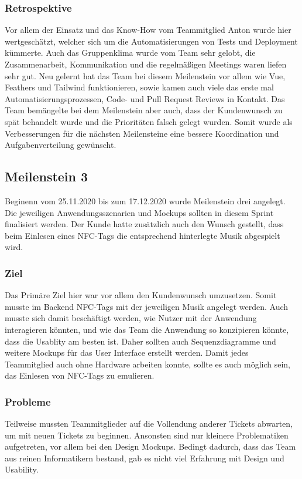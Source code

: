 \documentclass[10pt, a4paper, draft]{article}
\begin{document}
\subsubsection{Retrospektive}
Vor allem der Einsatz und das Know-How vom Teammitglied Anton wurde hier wertgeschätzt, welcher sich um die Automatisierungen von Tests und Deployment kümmerte.
Auch das Gruppenklima wurde vom Team sehr gelobt, die Zusammenarbeit, Kommunikation und die regelmäßigen Meetings waren liefen sehr gut.
Neu gelernt hat das Team bei diesem Meilenstein vor allem wie Vue, Feathers und Tailwind funktionieren, sowie kamen auch viele das erste mal Automatisierungsprozessen, Code- und Pull Request Reviews in Kontakt.
Das Team bemängelte bei dem Meilenstein aber auch, dass der Kundenwunsch zu spät behandelt wurde und die Prioritäten falsch gelegt wurden.
Somit wurde als Verbesserungen für die nächsten Meilensteine eine bessere Koordination und Aufgabenverteilung gewünscht.

\subsection{Meilenstein 3}
Beginenn vom 25.11.2020 bis zum 17.12.2020 wurde Meilenstein drei angelegt.
Die jeweiligen Anwendungsszenarien und Mockups sollten in diesem Sprint finalisiert werden.
Der Kunde hatte zusätzlich auch den Wunsch gestellt, dass beim Einlesen eines NFC-Tags die entsprechend hinterlegte Musik abgespielt wird.
\subsubsection{Ziel}
Das Primäre Ziel hier war vor allem den Kundenwunsch umzusetzen. Somit musste im Backend NFC-Tags mit der jeweiligen Musik angelegt werden.
Auch musste sich damit beschäftigt werden, wie Nutzer mit der Anwendung interagieren könnten, und wie das Team die Anwendung so konzipieren könnte, dass die Usablity am besten ist.
Daher sollten auch Sequenzdiagramme und weitere Mockups für das User Interface erstellt werden.
Damit jedes Teammitglied auch ohne Hardware arbeiten konnte, sollte es auch möglich sein, das Einlesen von NFC-Tags zu emulieren.
\subsubsection{Probleme}
Teilweise mussten Teammitglieder auf die Vollendung anderer Tickets abwarten, um mit neuen Tickets zu beginnen.
Ansonsten sind nur kleinere Problematiken aufgetreten, vor allem bei den Design Mockups.
Bedingt dadurch, dass das Team aus reinen Informatikern bestand, gab es nicht viel Erfahrung mit Design und Usability.
\end{document}
